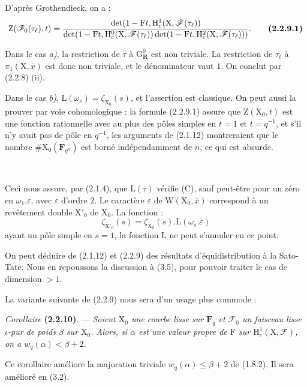 \documentclass[11pt,leqno]{article}
\newcommand{\Page}[1]{\ifvmode\noindent\else\unskip\ \fi{\footnotesize\textcolor{gray}{[p.\,#1]}}\ \ignorespaces}
\begin{document}
D’après Grothendieck, on a :
\[
\mathrm Z(\mathscr F_0(\tau_\ell),t)
=
\frac{
 \det(1-\mathrm F t,\mathrm H_c^1(\mathrm X,\mathscr F(\tau_\ell))
}{
 \det(1-\mathrm F t,\mathrm H_c^0(\mathrm X,\mathscr F(\tau_\ell))
 \det(1-\mathrm F t,\mathrm H_c^2(\mathrm X,\mathscr F(\tau_\ell)))
}.
\tag*{\textbf{(2.2.9.1)}}
\]

Dans le cas \textit{a)}, la restriction de \(\tau\) à \(\mathrm G_{\mathbf R}^0\) est non triviale. La restriction de \(\tau_\ell\) à \(\pi_1(\mathrm X,\bar{x})\) est donc non triviale, et le dénominateur vaut \(1\). On conclut par (2.2.8) (ii).

Dans le cas \textit{b)}, \(\mathrm L(\omega_s)=\zeta_{\mathrm X_0}(s)\), et l’assertion est classique. On peut aussi la prouver par voie cohomologique : la formule (2.2.9.1) assure que \(\mathrm Z(\mathrm X_0,t)\) est une fonction rationnelle avec au plus des pôles simples en \(t=1\) et \(t=q^{-1}\), et s’il n’y avait pas de pôle en \(q^{-1}\), les arguments de (2.1.12) montreraient que le nombre \(\#\mathrm X_0(\mathbf F_{q^n})\) est borné indépendamment de \(n\), ce qui est absurde.

\Page{196}

Ceci nous assure, par (2.1.4), que \(\mathrm L(\tau)\) vérifie (C), sauf peut-être pour un zéro en \(\omega_1.\varepsilon\), avec \(\varepsilon\) d’ordre \(2\). Le caractère \(\varepsilon\) de \(\mathrm W(\mathrm X_0,\bar{x})\) correspond à un revêtement double \(\mathrm X'_0\) de \(\mathrm X_0\). La fonction :
\[
\zeta_{\mathrm X'_0}(s)=\zeta_{\mathrm X_0}(s).\mathrm L(\omega_s.\varepsilon)
\]
ayant un pôle simple en \(s=1\), la fonction \(\mathrm L\) ne peut s’annuler en ce point.

On peut déduire de (2.1.12) et (2.2.9) des résultats d’équidistribution à la Sato-Tate. Nous en repoussons la discussion à (3.5), pour pouvoir traiter le cas de dimension \(>1\).

La variante suivante de (2.2.9) nous sera d’un usage plus commode :

\textit{Corollaire} \textbf{(2.2.10)}. — \textit{Soient \(\mathrm X_0\) une courbe lisse sur \(\mathbf F_q\) et \(\mathscr F_0\) un faisceau lisse \(\iota\)-pur de poids \(\beta\) sur \(\mathrm X_0\). Alors, si \(\alpha\) est une valeur propre de \(\mathrm F\) sur \(\mathrm H_c^1(\mathrm X,\mathscr F)\), on a \(w_q(\alpha)<\beta+2\).}

Ce corollaire améliore la majoration triviale \(w_q(\alpha)\leq\beta+2\) de (1.8.2). Il sera amélioré en (3.2).
\end{document}
